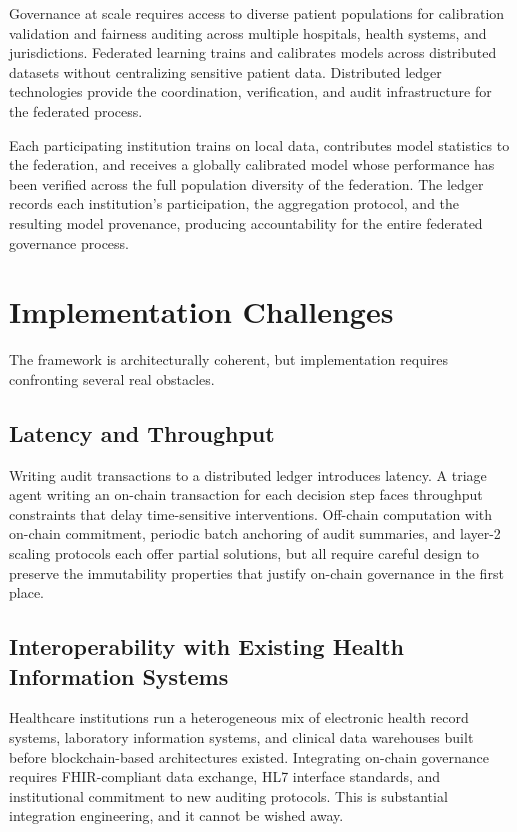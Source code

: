 \documentclass[12pt,a4paper]{article}
\begin{document}
Governance at scale requires access to diverse patient populations
for calibration validation and fairness auditing across multiple
hospitals, health systems, and jurisdictions. Federated learning
trains and calibrates models across distributed datasets without
centralizing sensitive patient data. Distributed ledger
technologies provide the coordination, verification, and audit
infrastructure for the federated process.\cite{rieke2020}

Each participating institution trains on local data, contributes
model statistics to the federation, and receives a globally
calibrated model whose performance has been verified across the
full population diversity of the federation. The ledger records
each institution's participation, the aggregation protocol, and
the resulting model provenance, producing accountability for the
entire federated governance process.

\section*{Implementation Challenges}

The framework is architecturally coherent, but implementation
requires confronting several real obstacles.

\subsection*{Latency and Throughput}

Writing audit transactions to a distributed ledger introduces
latency. A triage agent writing an on-chain transaction for each
decision step faces throughput constraints that delay
time-sensitive interventions. Off-chain computation with on-chain
commitment, periodic batch anchoring of audit summaries, and
layer-2 scaling protocols each offer partial solutions, but all
require careful design to preserve the immutability properties
that justify on-chain governance in the first place.

\subsection*{Interoperability with Existing Health Information
Systems}

Healthcare institutions run a heterogeneous mix of electronic
health record systems, laboratory information systems, and
clinical data warehouses built before blockchain-based
architectures existed. Integrating on-chain governance requires
FHIR-compliant data exchange, HL7 interface standards, and
institutional commitment to new auditing protocols. This is
substantial integration engineering, and it cannot be wished
away.
\end{document}
